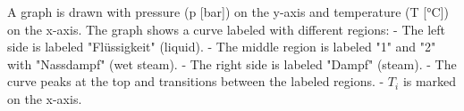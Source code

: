 A graph is drawn with pressure (p [bar]) on the y-axis and temperature (T [°C]) on the x-axis. The graph shows a curve labeled with different regions:  
- The left side is labeled "Flüssigkeit" (liquid).  
- The middle region is labeled "1" and "2" with "Nassdampf" (wet steam).  
- The right side is labeled "Dampf" (steam).  
- The curve peaks at the top and transitions between the labeled regions.  
- \( T_i \) is marked on the x-axis.